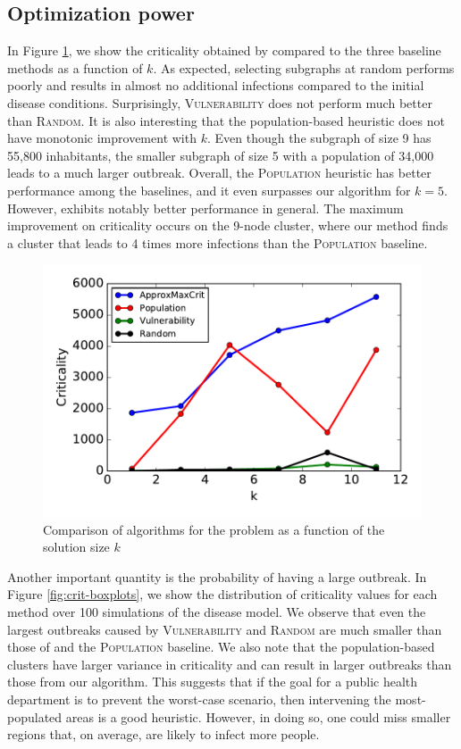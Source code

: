 \subsection{Optimization power}
\label{sec:opt-power}
In Figure \ref{fig:cri-baseline-compare}, we show the criticality obtained by \algomaxcrit{} compared to the three baseline methods as a function of $k$. As expected, selecting subgraphs at random performs poorly and results in almost no additional infections compared to the initial disease conditions. Surprisingly, \textsc{Vulnerability} does not perform much better than \textsc{Random}. It is also interesting that the population-based heuristic does not have monotonic improvement with $k$. Even though the subgraph of size 9 has 55,800 inhabitants, the smaller subgraph of size 5 with a population of 34,000 leads to a much larger outbreak. 
Overall, the \textsc{Population} heuristic has better performance among the baselines, and it even surpasses our algorithm for $k=5$. However, \algomaxcrit{} exhibits notably better performance in general. The maximum improvement on criticality occurs on the 9-node cluster, where our method finds a cluster that leads to 4 times more infections than the \textsc{Population} baseline.

\begin{figure}
\centering
\includegraphics[width=.35\textwidth]{img/criticality-baseline-comparison.pdf}
\vspace{-.2in}
\caption{Comparison of algorithms for the \maxcrit{} problem as a function of the solution size $k$}
\label{fig:cri-baseline-compare}
\end{figure}

Another important quantity is the probability of having a large outbreak.
In Figure \ref{fig:crit-boxplots}, we show the distribution of criticality values 
for each method over 100 simulations of the disease model.
We observe that even the largest outbreaks caused by \textsc{Vulnerability} and \textsc{Random} are much smaller than those of \algomaxcrit{} and the \textsc{Population} baseline. We also note that the population-based clusters have larger variance in criticality and can result in larger outbreaks than those from our algorithm. This suggests that if the goal for a public health department is to prevent the worst-case scenario, then intervening the most-populated areas is a good heuristic. However, in doing so, one could miss smaller regions that, on average, are likely to infect more people.

